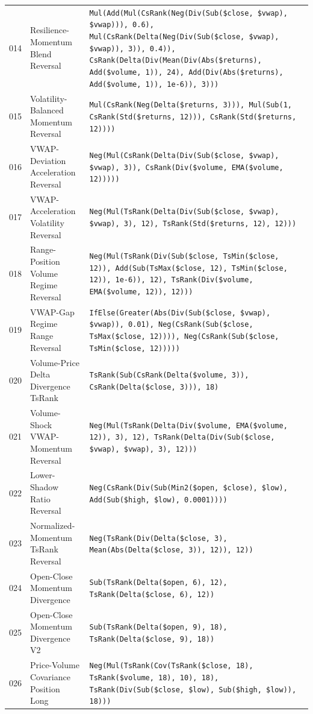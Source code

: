 \begin{longtable}{@{}llp{}@{}}
014 & Resilience-Momentum Blend Reversal & \texttt{Mul(Add(Mul(CsRank(Neg(Div(Sub(\$close, \$vwap), \$vwap))), 0.6), Mul(CsRank(Delta(Neg(Div(Sub(\$close, \$vwap), \$vwap)), 3)), 0.4)), CsRank(Delta(Div(Mean(Div(Abs(\$returns), Add(\$volume, 1)), 24), Add(Div(Abs(\$returns), Add(\$volume, 1)), 1e-6)), 3)))} \\
015 & Volatility-Balanced Momentum Reversal & \texttt{Mul(CsRank(Neg(Delta(\$returns, 3))), Mul(Sub(1, CsRank(Std(\$returns, 12))), CsRank(Std(\$returns, 12))))} \\
016 & VWAP-Deviation Acceleration Reversal & \texttt{Neg(Mul(CsRank(Delta(Div(Sub(\$close, \$vwap), \$vwap), 3)), CsRank(Div(\$volume, EMA(\$volume, 12)))))} \\
017 & VWAP-Acceleration Volatility Reversal & \texttt{Neg(Mul(TsRank(Delta(Div(Sub(\$close, \$vwap), \$vwap), 3), 12), TsRank(Std(\$returns, 12), 12)))} \\
018 & Range-Position Volume Regime Reversal & \texttt{Neg(Mul(TsRank(Div(Sub(\$close, TsMin(\$close, 12)), Add(Sub(TsMax(\$close, 12), TsMin(\$close, 12)), 1e-6)), 12), TsRank(Div(\$volume, EMA(\$volume, 12)), 12)))} \\
019 & VWAP-Gap Regime Range Reversal & \texttt{IfElse(Greater(Abs(Div(Sub(\$close, \$vwap), \$vwap)), 0.01), Neg(CsRank(Sub(\$close, TsMax(\$close, 12)))), Neg(CsRank(Sub(\$close, TsMin(\$close, 12)))))} \\
020 & Volume-Price Delta Divergence TsRank & \texttt{TsRank(Sub(CsRank(Delta(\$volume, 3)), CsRank(Delta(\$close, 3))), 18)} \\
021 & Volume-Shock VWAP-Momentum Reversal & \texttt{Neg(Mul(TsRank(Delta(Div(\$volume, EMA(\$volume, 12)), 3), 12), TsRank(Delta(Div(Sub(\$close, \$vwap), \$vwap), 3), 12)))} \\
022 & Lower-Shadow Ratio Reversal & \texttt{Neg(CsRank(Div(Sub(Min2(\$open, \$close), \$low), Add(Sub(\$high, \$low), 0.0001))))} \\
023 & Normalized-Momentum TsRank Reversal & \texttt{Neg(TsRank(Div(Delta(\$close, 3), Mean(Abs(Delta(\$close, 3)), 12)), 12))} \\
024 & Open-Close Momentum Divergence & \texttt{Sub(TsRank(Delta(\$open, 6), 12), TsRank(Delta(\$close, 6), 12))} \\
025 & Open-Close Momentum Divergence V2 & \texttt{Sub(TsRank(Delta(\$open, 9), 18), TsRank(Delta(\$close, 9), 18))} \\
026 & Price-Volume Covariance Position Long & \texttt{Neg(Mul(TsRank(Cov(TsRank(\$close, 18), TsRank(\$volume, 18), 10), 18), TsRank(Div(Sub(\$close, \$low), Sub(\$high, \$low)), 18)))} \\

\end{longtable}
